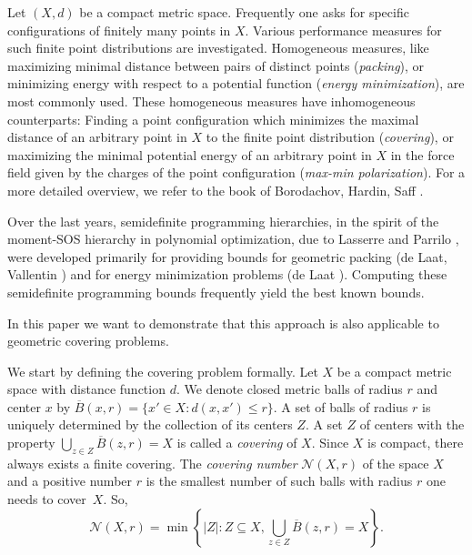 \documentclass{amsart}
\begin{document}
Let $(X,d)$ be a compact metric space. Frequently one asks for specific
configurations of finitely many points in $X$. Various performance
measures for such finite point distributions are
investigated. Homogeneous measures, like maximizing minimal distance
between pairs of distinct points (\textit{packing}), or minimizing
energy with respect to a potential function (\textit{energy
  minimization}), are most commonly used. These homogeneous measures
have inhomogeneous counterparts: Finding a point configuration which
minimizes the maximal distance of an arbitrary point in $X$ to the
finite point distribution (\textit{covering}), or maximizing the
minimal potential energy of an arbitrary point in $X$ in the force
field given by the charges of the point configuration (\textit{max-min
  polarization}). For a more detailed overview, we refer to the book
of Borodachov, Hardin, Saff \cite{Borodachov-Hardin-Saff-2019}.

\medskip

Over the last years, semidefinite programming hierarchies, in the
spirit of the moment-SOS hierarchy in polynomial optimization, due to
Lasserre \cite{Lasserre-2001} and Parrilo \cite{Parrilo-2003}, were developed primarily for providing bounds for geometric
packing (de Laat, Vallentin
\cite{de-Laat-Vallentin-2015}) and for energy minimization problems (de Laat
\cite{de-Laat-2020}). Computing these semidefinite programming bounds
frequently yield the best known bounds.

\medskip

In this paper we want to demonstrate that this approach is also
applicable to geometric covering problems.

\medskip

We start by defining the covering problem formally. Let $X$ be a
compact metric space with distance function $d$. We denote closed
metric balls of radius $r$ and center $x$ by
$\overline{B}(x,r) = \{x' \in X : d(x,x') \leq r\}$.  A set of balls of
radius $r$ is uniquely determined by the collection of its centers
$Z$.  A set $Z$ of centers with the property
$ \bigcup_{z \in Z} \overline{B}(z,r) = X$ is called a \emph{covering} of $X$.
Since $X$ is compact, there always exists a finite covering. The
\emph{covering number} $\mathcal{N}(X,r)$ of the space $X$ and a
positive number $r$ is the smallest number of such balls with radius
$r$ one needs to cover~$X$. So,
\[
  \mathcal{N}(X,r) = \min\left\{ |Z| : Z \subseteq X, \bigcup_{z \in
      Z} \overline{B}(z,r) = X\right\}.
\]
\end{document}
